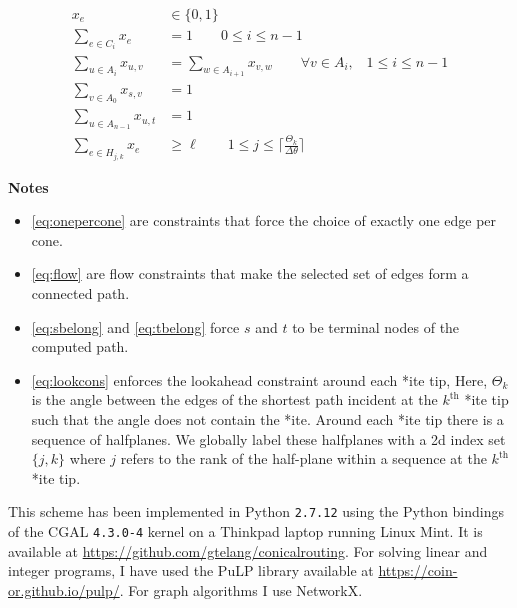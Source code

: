 \begin{enumerate}
\begin{align}
  x_e &\in \{0,1\} \\
  \sum_{e\in C_i} x_e &= 1  \qquad   0 \leq i \leq n-1 \label{eq:onepercone} \\ 
  \sum_{u \in A_i} x_{u,v} &= \sum_{w \in A_{i+1}}x_{v,w} \qquad \forall v \in A_i ,  \;\;\; 1\leq i \leq n-1  \label{eq:flow} \\ 
  \sum_{v \in A_0} x_{s,v} &= 1      \label{eq:sbelong}    \\   
  \sum_{u \in A_{n-1}} x_{u,t} &= 1  \label{eq:tbelong} \\
    \sum_{e\in H_{j,k}} x_{e } &\geq \ell \qquad 1\leq j \leq \lceil \frac{\Theta_k}{\Delta \theta} \rceil \label{eq:lookcons}
\end{align}
 
{\large \textbf{Notes} \normalsize}
    
\begin{itemize}
\item   \autoref{eq:onepercone} are constraints that force the choice of exactly one edge per cone. 

\item   \autoref{eq:flow} are flow constraints that make the selected set of edges form a connected path. 
     
\item   \autoref{eq:sbelong} and \autoref{eq:tbelong} force $s$ and $t$ to be terminal nodes of the computed path.   

\item   \autoref{eq:lookcons} enforces the lookahead constraint around each *ite tip, Here, $\Theta_k$ is the angle between the edges of the shortest path incident at the $k^{\text{th}}$ *ite tip
   such that the angle does not contain the *ite. Around each *ite tip there is a sequence of halfplanes. We globally label 
   these halfplanes with a 2d index set $\{j,k\}$ where $j$ refers to the rank of the half-plane within a sequence at the $k^{\text{th}}$ *ite
   tip.
\end{itemize}

 \end{enumerate}

This scheme has been implemented in Python {\tt 2.7.12} using the Python bindings of the CGAL {\tt 4.3.0-4} kernel on a Thinkpad laptop running Linux Mint. It is available 
at \url{https://github.com/gtelang/conicalrouting}. For solving linear and integer programs, I have used the PuLP 
library available at \url{https://coin-or.github.io/pulp/}. For graph algorithms I use NetworkX. 



